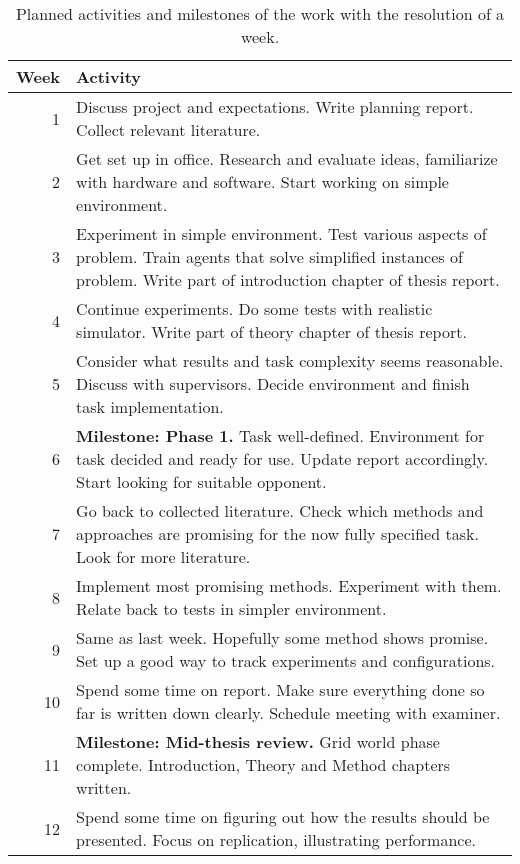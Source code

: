 \documentclass{article}
\begin{document}
\begin{table}
    \caption{Planned activities and milestones of the work with the resolution of a week.}
    \label{tab:timeplan}
    \centering
    \begin{tabular}{r p{.80\linewidth}}
        \toprule
        Week & Activity \\
        \midrule
        1 &
        Discuss project and expectations. Write planning report. Collect relevant literature.
        \\
        2 & Get set up in office. Research and evaluate ideas, familiarize with hardware and software. Start working on simple environment.
        \\
        3 &
        Experiment in simple environment. Test various aspects of problem. Train agents that solve simplified instances of problem.
        Write part of introduction chapter of thesis report.
        \\
        4 &
        Continue experiments. Do some tests with realistic simulator.
        Write part of theory chapter of thesis report.
        \\
        5 &
        Consider what results and task complexity seems reasonable. Discuss with supervisors. Decide environment and finish task implementation.
        \\
        6 & \textbf{Milestone: Phase 1.}
        Task well-defined. Environment for task decided and ready for use. Update report accordingly. Start looking for suitable opponent.
        \\
        7 &
        Go back to collected literature. Check which methods and approaches are promising for the now fully specified task. Look for more literature.
        \\
        8 &
        Implement most promising methods. Experiment with them. Relate back to tests in simpler environment.
         \\
        9 &
        Same as last week. Hopefully some method shows promise. Set up a good way to track experiments and configurations.
        \\
        10 &
        Spend some time on report. Make sure everything done so far is written down clearly. Schedule meeting with examiner.
        \\
        11 & \textbf{Milestone: Mid-thesis review.}
        Grid world phase complete. Introduction, Theory and Method chapters written.
        \\
        12 &
        Spend some time on figuring out how the results should be presented. Focus on replication, illustrating performance.

\end{tabular}
\end{table}
\end{document}
